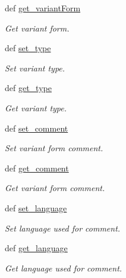 \begin{DoxyCompactItemize}
def \hyperlink{classlmf_1_1src_1_1core_1_1form__representation_1_1_form_representation_ac977eb7028af4f5715a4cb1f4908c627}{get\+\_\+variant\+Form}
\begin{DoxyCompactList}\small\item\em Get variant form. \end{DoxyCompactList}\item 
def \hyperlink{classlmf_1_1src_1_1core_1_1form__representation_1_1_form_representation_acb1bd217666635fea4e9af729865d84c}{set\+\_\+type}
\begin{DoxyCompactList}\small\item\em Set variant type. \end{DoxyCompactList}\item 
def \hyperlink{classlmf_1_1src_1_1core_1_1form__representation_1_1_form_representation_a9f898af27f89d2673e8c6c70c9b3bba8}{get\+\_\+type}
\begin{DoxyCompactList}\small\item\em Get variant type. \end{DoxyCompactList}\item 
def \hyperlink{classlmf_1_1src_1_1core_1_1form__representation_1_1_form_representation_aa8c266a62f47e9085d0a3f3a4bf01212}{set\+\_\+comment}
\begin{DoxyCompactList}\small\item\em Set variant form comment. \end{DoxyCompactList}\item 
def \hyperlink{classlmf_1_1src_1_1core_1_1form__representation_1_1_form_representation_a79f6d3d638ba7f31731619f296e0be3d}{get\+\_\+comment}
\begin{DoxyCompactList}\small\item\em Get variant form comment. \end{DoxyCompactList}\item 
def \hyperlink{classlmf_1_1src_1_1core_1_1form__representation_1_1_form_representation_a0e946290f55acd1291ecef48b7b0eb3a}{set\+\_\+language}
\begin{DoxyCompactList}\small\item\em Set language used for comment. \end{DoxyCompactList}\item 
def \hyperlink{classlmf_1_1src_1_1core_1_1form__representation_1_1_form_representation_a5e45b057ff34471018b3fef4c89a4dc3}{get\+\_\+language}
\begin{DoxyCompactList}\small\item\em Get language used for comment. \end{DoxyCompactList}\item 

\end{DoxyCompactItemize}
